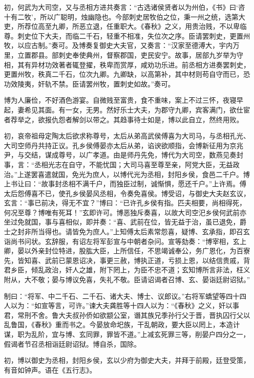\documentclass[]{article}
\begin{document}
初，何武为大司空，又与丞相方进共奏言：``古选诸侯贤者以为州伯，《书》曰`咨十有二牧'，所以广聪明，烛幽隐也。今部刺史居牧伯之位，秉一州之统，选第大吏，所荐位高至九卿，所恶立退，任重职大。《春秋》之义，用贵治贱，不以卑临尊。刺史位下大夫，而临二千石，轻重不相准，失位次之序。臣请罢刺史，更置州牧，以应古制。''奏可。及博奏复御史大夫官，又奏言：``汉家至德溥大，宇内万里，立置郡县。部刺史奉使典州，督察郡国，吏民安宁。故事，居部九岁举为守相，其有异材功效著者辄登擢，秩卑而赏厚，咸劝功乐进。前丞相方进奏罢刺史，更置州牧，秩真二千石，位次九卿。九卿缺，以高第补，其中材则苟自守而已，恐功效陵夷，奸轨不禁。臣请罢州牧，置刺史如故。''奏可。

博为人廉俭，不好酒色游宴。自微贱至富贵，食不重味，案上不过三怀，夜寝早起，妻希见其面。有一女，无男。然好乐士大夫，为郡守九卿，宾客满门，欲仕宦者荐举之，欲报仇怨者解剑以带之。其趋事待士如是，博以此自立，然终用败。

初，哀帝祖母定陶太后欲求称尊号，太后从弟高武侯傅喜为大司马，与丞相孔光、大司空师丹共持正议。孔乡侯傅晏亦太后从弟，谄谀欲顺指，会博新征用为京兆尹，与交结，谋成尊号，以广孝道。由是师丹先免，博代为大司空，数燕见奏封事，言：``丞相光志在自守，不能忧国；大司马喜至尊至亲，阿党大臣，无益政治。''上遂罢喜遣就国，免光为庶人，以博代光为丞相，封阳乡侯，食邑二千户。博上书让曰：``故事封丞相不满千户，而独臣过制，诚惭惧，愿还千户。''上许焉。傅太后怨傅喜不已，使孔乡侯晏风丞相，令奏免喜侯。博受诏，与御史大夫赵玄议，玄言：``事已前决，得无不宜？''博曰：``已许孔乡侯有指。匹夫相要，尚相得死，何况至尊？博唯有死耳！''玄即许可。博恶独斥奏喜，以故大司空汜乡侯何武前亦坐过免就国，事与喜相似，即并奏：``喜、武前在位，皆无益于治，虽已退免，爵士之封非所当得也。请皆免为庶人。''上知傅太后素常怨喜，疑博、玄承指，即召玄诣尚书问状。玄辞服，有诏左将军彭宣与中朝者杂问。宣等劾奏：``博宰相，玄上卿，晏以外亲封位特进，股肱大臣，上所信任，不思竭诚奉公，务广恩化，为百寮先，皆知喜、武前已蒙恩诏决，事更三赦，博执正道，亏损上恩，以结信贵戚，背君乡臣，倾乱政治，奸人之雄，附下罔上，为臣不忠不道；玄知博所言非法，枉义附从，大不敬；晏与博议免喜，失礼不敬。臣请诏谒者召博、玄、晏诣廷尉诏狱。''

制曰：``将军、中二千石、二千石、诸大夫、博士、议郎议。''右将军蟜望等四十四人以为：``如宣等言，可许。''谏大夫龚胜等十四人以为：``《春秋》之义，奸以事君，常刑不舍。鲁大夫叔孙侨如欲颛公室，谮其族兄季孙行父于晋，晋执囚行父以乱鲁国，《春秋》重而书之。今晏放命圯族，干乱朝政，要大臣以罔上，本造计谋，职为乱阶，宜与博、玄同罪，罪皆不道。''上减玄死罪三等，削晏户四分之一，假谒者节召丞相诣廷尉诏狱。博自杀，国除。

初，博以御史为丞相，封阳乡侯，玄以少府为御史大夫，并拜于前殿，廷登受策，有音如钟声。语在《五行志》。
\end{document}
